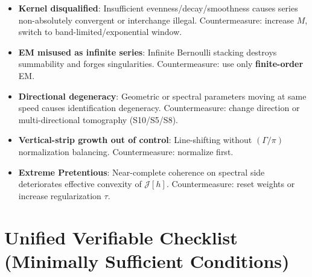 \documentclass[11pt,a4paper]{article}
\theoremstyle{remark}
\begin{document}
\begin{itemize}
\item \textbf{Kernel disqualified}: Insufficient evenness/decay/smoothness causes series non-absolutely convergent or interchange illegal. Countermeasure: increase $M$, switch to band-limited/exponential window.

\item \textbf{EM misused as infinite series}: Infinite Bernoulli stacking destroys summability and forges singularities. Countermeasure: use only \textbf{finite-order} EM.

\item \textbf{Directional degeneracy}: Geometric or spectral parameters moving at same speed causes identification degeneracy. Countermeasure: change direction or multi-directional tomography (S10/S5/S8).

\item \textbf{Vertical-strip growth out of control}: Line-shifting without $(\Gamma/\pi)$ normalization balancing. Countermeasure: normalize first.

\item \textbf{Extreme Pretentious}: Near-complete coherence on spectral side deteriorates effective convexity of $\mathcal{J}[h]$. Countermeasure: reset weights or increase regularization $\tau$.
\end{itemize}

\section{Unified Verifiable Checklist (Minimally Sufficient Conditions)}
\end{document}
